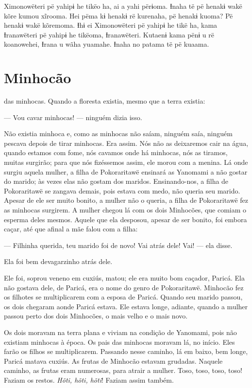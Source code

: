 Ximonowëteri pë yahipɨ he tikëo ha, ai a yahi përɨoma. Ɨnaha të pë
henakɨ wakë kõre kumou xĩrooma. Hei pëma kɨ henakɨ rë kurenaha, pë
henakɨ kuoma? Pë henakɨ wakë kõremoma. Ɨhɨ ei Ximonowëteri pë yahipɨ he
tikë ha, kama Ɨranawëteri pë yahipɨ he tikëoma, Ɨranawëteri. Kutaenɨ
kama pënɨ u rë koanowehei, Ɨrana u wãha yuamahe. Ɨnaha no patama të pë
kuaama. 

\chapter{Minhocão}
 
 das minhocas. Quando a floresta existia, mesmo que a terra
existia: 

--- Vou cavar minhocas! --- ninguém dizia isso. 

Não existia minhoca e, como as minhocas não saíam, ninguém saía, ninguém
pescava depois de tirar minhocas. Era assim. Nós não as deixaremos cair
na água, quando estamos com fome, nós cavamos onde há minhocas, nós as
tiramos, muitas surgirão; para que nós fizéssemos assim, ele morou com a
menina. Lá onde surgiu aquela mulher, a filha de Pokoraritawë ensinará
as Yanomami a não gostar do marido;  às vezes elas não gostam dos maridos. Ensinando-nos, a filha de Pokoraritawë se zangava demais, pois
estava com medo, não queria seu marido. Apesar de ele ser muito bonito,
a mulher não o queria, a filha de Pokoraritawë fez as minhocas surgirem.
A mulher chegou lá com os dois Minhocões, que comiam o esperma deles
mesmos. Aquele que ela desposou, apesar de ser bonito, foi embora caçar,
até que afinal a mãe falou com a filha: 

--- Filhinha querida, teu marido foi de novo! Vai atrás dele! Vai! ---
ela disse. 

Ela foi bem devagarzinho atrás dele. 

Ele foi, soprou veneno em cuxiús, matou; ele era muito bom caçador,
Paricá. Ela não gostava dele, de Paricá, era o nome do genro de
Pokoraritawë. Minhocão fez os filhotes se multiplicarem com a esposa de
Paricá. Quando seu marido passou, os dois chegaram aonde Paricá estava.
Ele estava longe, adiante, quando a mulher passou perto dos dois
Minhocões, o mais velho e o mais novo. 

Os dois moravam na terra plana e viviam na condição de Yanomami, pois
não existiam minhocas à época. Os pais das minhocas moravam lá, no
início. Eles farão os filhos se multiplicarem. Passando nesse caminho, lá
em baixo, bem longe, Paricá matava cuxiús. As frutas de Minhocão estavam
grudadas. Naquele caminho, as frutas eram numerosas, para atrair a
mulher. Toso, toso, toso, toso! Faziam os restos. \textit{Hõti, hõti, hõti}!
Faziam assim também. 

